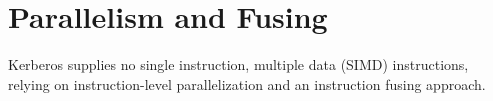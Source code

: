 \chapter{Parallelism and Fusing}

Kerberos supplies no single instruction, multiple data (SIMD) instructions, relying on instruction-level parallelization and an instruction fusing approach.
